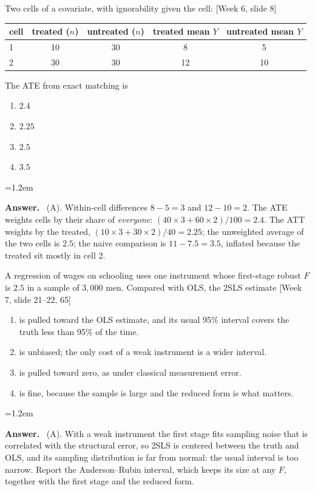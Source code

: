 \documentclass[11pt]{article}
\newenvironment{answer}{\par\smallskip
  \begin{list}{}{\leftmargin=1.2em\rightmargin=0pt}\item[]\color{dukeblue}%
  \textbf{Answer.}\ }{\end{list}\smallskip}
\newcommand{\slideref}[2]{{\footnotesize\color{gray}[Week #1, slide #2]}}
\begin{document}
\begin{enumerate}[leftmargin=*,itemsep=8pt]
\item Two cells of a covariate, with ignorability given the cell: \slideref{6}{8}
\begin{center}\small
\renewcommand{\arraystretch}{1.05}
\begin{tabular}{lcccc}
\toprule
cell & treated ($n$) & untreated ($n$) & treated mean $Y$ & untreated mean $Y$ \\
\midrule
1 & 10 & 30 & 8 & 5 \\
2 & 30 & 30 & 12 & 10 \\
\bottomrule
\end{tabular}
\end{center}
      The ATE from exact matching is
      \begin{enumerate}[label=(\Alph*),itemsep=0pt]
      \item $2.4$
      \item $2.25$
      \item $2.5$
      \item $3.5$
      \end{enumerate}
\begin{answer}
(A). Within-cell differences $8 - 5 = 3$ and $12 - 10 = 2$. The ATE weights cells by their
share of \emph{everyone}: $(40 \times 3 + 60 \times 2)/100 = 2.4$. The ATT weights by the
treated, $(10 \times 3 + 30 \times 2)/40 = 2.25$; the unweighted average of the two cells
is $2.5$; the naive comparison is $11 - 7.5 = 3.5$, inflated because the treated sit mostly
in cell 2.
\end{answer}

\item A regression of wages on schooling uses one instrument whose first-stage robust $F$
      is $2.5$ in a sample of $3{,}000$ men. Compared with OLS, the 2SLS estimate
      \slideref{7}{21--22, 65}
      \begin{enumerate}[label=(\Alph*),itemsep=0pt]
      \item is pulled toward the OLS estimate, and its usual 95\% interval covers the truth
            less than 95\% of the time.
      \item is unbiased; the only cost of a weak instrument is a wider interval.
      \item is pulled toward zero, as under classical measurement error.
      \item is fine, because the sample is large and the reduced form is what matters.
      \end{enumerate}
\begin{answer}
(A). With a weak instrument the first stage fits sampling noise that is correlated with the
structural error, so 2SLS is centered between the truth and OLS, and its sampling
distribution is far from normal: the usual interval is too narrow. Report the
Anderson--Rubin interval, which keeps its size at any $F$, together with the first stage
and the reduced form.
\end{answer}
\end{enumerate}
\end{document}
